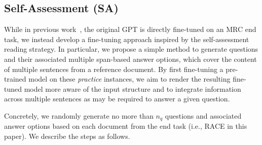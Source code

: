 \documentclass[11pt,a4paper]{article}
\newcommand{\ie}{{i.e.}}
\begin{document}
\subsection{Self-Assessment (SA)}
\label{sec:sa}
While in previous work~\cite{radfordimproving}, the original GPT is directly fine-tuned on
an MRC end task, we instead develop a fine-tuning approach inspired by the self-assessment reading strategy.
In particular, we propose a simple method to generate questions and their associated multiple span-based answer options, which cover the content of multiple sentences from a reference document. By first fine-tuning a pre-trained model on these \emph{practice} instances, we aim to render the resulting fine-tuned model more 
aware of the input structure and to integrate information across multiple sentences as may be required to answer a given question. 

Concretely, we randomly generate no more than $n_{q}$ questions and associated answer options based on each document from the end task (\ie, RACE in this paper). We describe the steps as follows.
\end{document}
